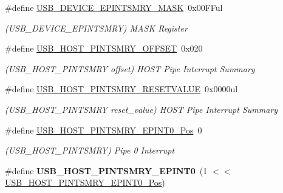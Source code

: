\begin{DoxyCompactItemize}
\item 
\hypertarget{group___s_a_m_l21___u_s_b_ga653ef1be93b032a0f84e8c49b922889b}{}\#define \hyperlink{group___s_a_m_l21___u_s_b_ga653ef1be93b032a0f84e8c49b922889b}{U\+S\+B\+\_\+\+D\+E\+V\+I\+C\+E\+\_\+\+E\+P\+I\+N\+T\+S\+M\+R\+Y\+\_\+\+M\+A\+S\+K}~0x00\+F\+Ful\label{group___s_a_m_l21___u_s_b_ga653ef1be93b032a0f84e8c49b922889b}

\begin{DoxyCompactList}\small\item\em (U\+S\+B\+\_\+\+D\+E\+V\+I\+C\+E\+\_\+\+E\+P\+I\+N\+T\+S\+M\+R\+Y) M\+A\+S\+K Register \end{DoxyCompactList}\item 
\hypertarget{group___s_a_m_l21___u_s_b_ga363886d4ca47877d3929b00876e591d3}{}\#define \hyperlink{group___s_a_m_l21___u_s_b_ga363886d4ca47877d3929b00876e591d3}{U\+S\+B\+\_\+\+H\+O\+S\+T\+\_\+\+P\+I\+N\+T\+S\+M\+R\+Y\+\_\+\+O\+F\+F\+S\+E\+T}~0x020\label{group___s_a_m_l21___u_s_b_ga363886d4ca47877d3929b00876e591d3}

\begin{DoxyCompactList}\small\item\em (U\+S\+B\+\_\+\+H\+O\+S\+T\+\_\+\+P\+I\+N\+T\+S\+M\+R\+Y offset) H\+O\+S\+T Pipe Interrupt Summary \end{DoxyCompactList}\item 
\hypertarget{group___s_a_m_l21___u_s_b_gab99a8f3fccfcf969c757a48a9f6ff62f}{}\#define \hyperlink{group___s_a_m_l21___u_s_b_gab99a8f3fccfcf969c757a48a9f6ff62f}{U\+S\+B\+\_\+\+H\+O\+S\+T\+\_\+\+P\+I\+N\+T\+S\+M\+R\+Y\+\_\+\+R\+E\+S\+E\+T\+V\+A\+L\+U\+E}~0x0000ul\label{group___s_a_m_l21___u_s_b_gab99a8f3fccfcf969c757a48a9f6ff62f}

\begin{DoxyCompactList}\small\item\em (U\+S\+B\+\_\+\+H\+O\+S\+T\+\_\+\+P\+I\+N\+T\+S\+M\+R\+Y reset\+\_\+value) H\+O\+S\+T Pipe Interrupt Summary \end{DoxyCompactList}\item 
\hypertarget{group___s_a_m_l21___u_s_b_ga6657a88e54f315a23ad5bd37cb6e935c}{}\#define \hyperlink{group___s_a_m_l21___u_s_b_ga6657a88e54f315a23ad5bd37cb6e935c}{U\+S\+B\+\_\+\+H\+O\+S\+T\+\_\+\+P\+I\+N\+T\+S\+M\+R\+Y\+\_\+\+E\+P\+I\+N\+T0\+\_\+\+Pos}~0\label{group___s_a_m_l21___u_s_b_ga6657a88e54f315a23ad5bd37cb6e935c}

\begin{DoxyCompactList}\small\item\em (U\+S\+B\+\_\+\+H\+O\+S\+T\+\_\+\+P\+I\+N\+T\+S\+M\+R\+Y) Pipe 0 Interrupt \end{DoxyCompactList}\item 
\hypertarget{group___s_a_m_l21___u_s_b_gacd579a37a9c319ef0e639210fdbb0013}{}\#define {\bfseries U\+S\+B\+\_\+\+H\+O\+S\+T\+\_\+\+P\+I\+N\+T\+S\+M\+R\+Y\+\_\+\+E\+P\+I\+N\+T0}~(1 $<$$<$ \hyperlink{group___s_a_m_l21___u_s_b_ga6657a88e54f315a23ad5bd37cb6e935c}{U\+S\+B\+\_\+\+H\+O\+S\+T\+\_\+\+P\+I\+N\+T\+S\+M\+R\+Y\+\_\+\+E\+P\+I\+N\+T0\+\_\+\+Pos})\label{group___s_a_m_l21___u_s_b_gacd579a37a9c319ef0e639210fdbb0013}


\end{DoxyCompactItemize}
